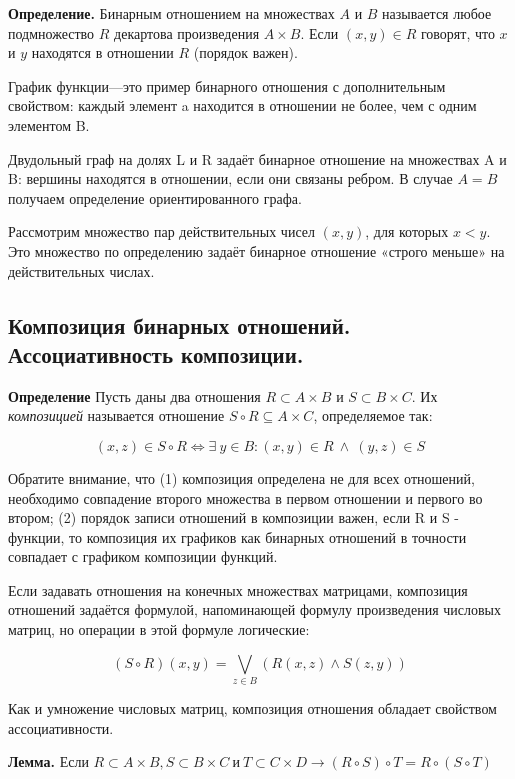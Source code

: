 \documentclass[a4paper, 10pt]{article}
\begin{document}
\textbf{Определение.} Бинарным отношением на множествах $A$ и $B$ называется любое подмножество $R$ декартова произведения $A \times B$. Если $(x, y) \in R$ говорят, что $x$ и $y$ находятся в отношении $R$ (порядок важен).

График функции—это пример бинарного отношения с дополнительным свойством: каждый элемент a находится в отношении не более, чем с одним элементом B.

Двудольный граф на долях L и R задаёт бинарное отношение на множествах A и B: вершины находятся в отношении, если они связаны ребром. В случае $A = B$
получаем определение ориентированного графа.

Рассмотрим множество пар действительных чисел $(x, y)$, для которых $x < y$. Это множество по определению задаёт бинарное отношение «строго меньше» на действительных числах.

\subsection{Композиция бинарных отношений. Ассоциативность композиции.}

\textbf{Определение} Пусть даны два отношения $R \subset A \times B$ и $S \subset B \times C$. Их \textit{композицией} называется отношение $S \circ R \subseteq A \times C$, определяемое так:

$$(x, z) \in S \circ R \Longleftrightarrow \exists \ y \in B \colon (x, y) \in R \ \wedge \ (y, z) \in S$$

Обратите внимание, что (1) композиция определена не для всех отношений, необходимо совпадение второго множества в первом отношении и первого во втором; (2) порядок записи отношений в композиции важен, если R и S - функции, то композиция их графиков как бинарных отношений в точности совпадает с графиком композиции функций.

Если задавать отношения на конечных множествах матрицами, композиция отношений задаётся формулой, напоминающей формулу произведения числовых матриц, но операции в этой формуле логические:

$$\displaystyle (S \circ R)(x, y) = \bigvee_{z \in B}(R(x, z) \wedge S(z, y))$$

Как и умножение числовых матриц, композиция отношения обладает свойством ассоциативности.

\textbf{Лемма.} Если $R \subset A \times B, S \subset B \times C \ \text{и} \ T \subset C \times D \to (R \circ S) \circ T = R \circ (S \circ T)$
\end{document}
